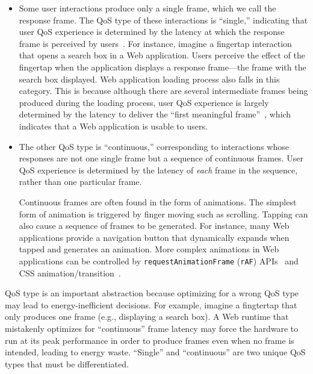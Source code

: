 \begin{itemize}
\item Some user interactions produce only a single frame, which we call the response frame. The QoS type of these interactions is ``single,'' indicating that user QoS experience is determined by the latency at which the response frame is perceived by users~\cite{eventlatency}. For instance, imagine a fingertap interaction that opens a search box in a Web application. Users perceive the effect of the fingertap when the application displays a response frame---the frame with the search box displayed. Web application loading process also falls in this category. This is because although there are several intermediate frames being produced during the loading process, user QoS experience is largely determined by the latency to deliver the ``first meaningful frame''~\cite{fmf}, which indicates that a Web application is usable to users.

\item The other QoS type is ``continuous,'' corresponding to interactions whose responses are not one single frame but a sequence of continuous frames. User QoS experience is determined by the latency of \textit{each} frame in the sequence, rather than one particular frame.

Continuous frames are often found in the form of animations. The simplest form of animation is triggered by finger moving such as scrolling. Tapping can also cause a sequence of frames to be generated. For instance, many Web applications provide a navigation button that dynamically expands when tapped and generates an animation. More complex animations in Web applications can be controlled by \texttt{requestAnimationFrame} (\texttt{rAF}) APIs~\cite{animationtiming} and CSS animation/transition~\cite{cssanimations, csstransitions}.
\end{itemize}

QoS type is an important abstraction because optimizing for a wrong QoS type may lead to energy-inefficient decisions. For example, imagine a fingtertap that only produces one frame  (e.g., displaying a search box). A Web runtime that mistakenly optimizes for ``continuous'' frame latency may force the hardware to run at its peak performance in order to produce frames even when no frame is intended, leading to energy waste. ``Single'' and ``continuous'' are two unique QoS types that must be differentiated.


